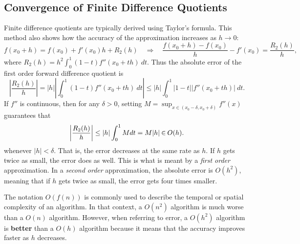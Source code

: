 \subsection*{Convergence of Finite Difference Quotients} %

Finite difference quotients are typically derived using Taylor's formula.
This method also shows how the accuracy of the approximation increases as $h\rightarrow 0$:
\begin{equation}
f(x_0+h) = f(x_0) + f'(x_0)h + R_2(h)
\quad\Longrightarrow\quad
\frac{f(x_0+h) - f(x_0)}{h} - f'(x_0) = \frac{R_2(h)}{h},
\label{eq:taylor-formula-forward-diff}
\end{equation}
where $R_2(h) = h^2 \int_0^1 (1-t) f''(x_0+th)\:dt$.
Thus the absolute error of the first order forward difference quotient is
\[
\left| \frac{R_2(h)}{h} \right|
= |h| \left|\int_0^1 (1 - t)f''(x_0+th)\:dt\right|
\leq |h| \int_0^1 |1 - t||f''(x_0+th)|\:dt.
\]
If $f''$ is continuous, then for any $\delta > 0$, setting $M = \sup_{x \in (x_0-\delta, x_0+\delta)} f''(x)$ guarantees that
\[
\left | \frac{R_2(h)}{h} \right | \leq |h|\int_0^1 M dt = M|h|\hspace{0.03in}{\in}\hspace{0.03in}O(h).
\]
whenever $|h| < \delta$.
That is, the error decreases at the same rate as $h$.
If $h$ gets twice as small, the error does as well.
This is what is meant by a \emph{first order} approximation.
In a \emph{second order} approximation, the absolute error is $O(h^2)$, meaning that if $h$ gets twice as small, the error gets four times smaller.

\begin{info} %
The notation $O(f(n))$ is commonly used to describe the temporal or spatial complexity of an algorithm.
In that context, a $O(n^2)$ algorithm is much worse than a $O(n)$ algorithm.
However, when referring to error, a $O(h^2)$ algorithm is \textbf{better} than a $O(h)$ algorithm because it means that the accuracy improves faster as $h$ decreases.
\end{info}

